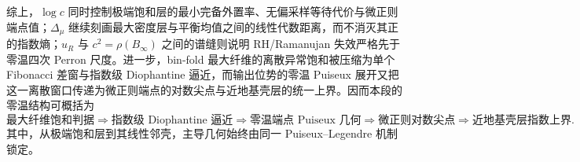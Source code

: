 \noindent
综上，\(\log c\) 同时控制极端饱和层的最小完备外置率、无偏采样等待代价与微正则端点值；\(\Delta_\mu\) 继续刻画最大密度层与平衡均值之间的线性代数距离，而不消灭其正的指数熵；\(u_R\) 与 \(c^2=\rho(B_\infty)\) 之间的谱缝则说明 RH/Ramanujan 失效严格先于零温四次 Perron 尺度。进一步，bin-fold 最大纤维的离散异常饱和被压缩为单个 Fibonacci 差窗与指数级 Diophantine 逼近，而输出位势的零温 Puiseux 展开又把这一离散窗口传递为微正则端点的对数尖点与近地基壳层的统一上界。因而本段的零温结构可概括为
\[
\text{最大纤维饱和判据}
\Longrightarrow
\text{指数级 Diophantine 逼近}
\Longrightarrow
\text{零温端点 Puiseux 几何}
\Longrightarrow
\text{微正则对数尖点}
\Longrightarrow
\text{近地基壳层指数上界}.
\]
其中，从极端饱和层到其线性邻壳，主导几何始终由同一 Puiseux--Legendre 机制锁定。

\endinput
